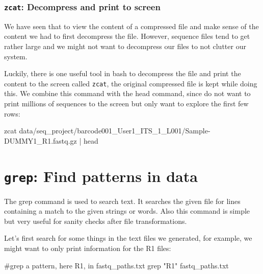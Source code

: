 \documentclass[
  letterpaper,
  DIV=11,
  numbers=noendperiod]{scrreprt}
\newenvironment{Shaded}{}{}
\newcommand{\CommentTok}[1]{\textcolor[rgb]{0.42,0.45,0.49}{#1}}
\newcommand{\FunctionTok}[1]{\textcolor[rgb]{0.44,0.26,0.76}{#1}}
\newcommand{\KeywordTok}[1]{\textcolor[rgb]{0.84,0.23,0.29}{#1}}
\newcommand{\NormalTok}[1]{\textcolor[rgb]{0.14,0.16,0.18}{#1}}
\newcommand{\StringTok}[1]{\textcolor[rgb]{0.01,0.18,0.38}{#1}}
\begin{document}
\subsubsection{\texorpdfstring{\texttt{zcat}: Decompress and print to
screen}{zcat: Decompress and print to screen}}\label{zcat-decompress-and-print-to-screen}

We have seen that to view the content of a compressed file and make
sense of the content we had to first decompress the file. However,
sequence files tend to get rather large and we might not want to
decompress our files to not clutter our system.

Luckily, there is one useful tool in bash to decompress the file and
print the content to the screen called \texttt{zcat}, the original
compressed file is kept while doing this. We combine this command with
the head command, since do not want to print millions of sequences to
the screen but only want to explore the first few rows:

\begin{Shaded}
\begin{Highlighting}[]
\FunctionTok{zcat}\NormalTok{ data/seq\_project/barcode001\_User1\_ITS\_1\_L001/Sample{-}DUMMY1\_R1.fastq.gz }\KeywordTok{|} \FunctionTok{head}
\end{Highlighting}
\end{Shaded}

\section{\texorpdfstring{\texttt{grep}: Find patterns in
data}{grep: Find patterns in data}}\label{grep-find-patterns-in-data}

The grep command is used to search text. It searches the given file for
lines containing a match to the given strings or words. Also this
command is simple but very useful for sanity checks after file
transformations.

Let's first search for some things in the text files we generated, for
example, we might want to only print information for the R1 files:

\begin{Shaded}
\begin{Highlighting}[]
\CommentTok{\#grep a pattern, here R1, in fastq\_paths.txt}
\FunctionTok{grep} \StringTok{"R1"}\NormalTok{ fastq\_paths.txt}
\end{Highlighting}
\end{Shaded}
\end{document}
